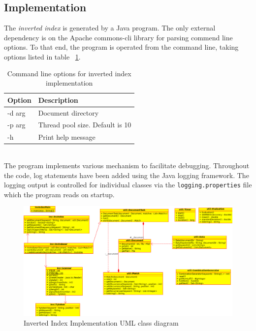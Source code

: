 \documentclass[10pt]{report}
\begin{document}
\subsection*{Implementation}
The \textit{inverted index} is generated by a Java
program. The only external dependency is on the Apache commons-cli
library for parsing commend line options. To that end, the program is
operated from the command line, taking options listed in table
~\ref{tab:invcommandline}.  
\\
\begin{table}[h]
  \centering
  \begin{tabular}{ |l|p{10cm}|} 
    \hline
    Option & Description \\ \hline
    -d \<arg\>  &  Document directory \\ \hline
    -p \<arg\>  &  Thread pool size. Default is 10 \\ \hline
    -h          &  Print help message \\ \hline
  \end{tabular}
  \caption{Command line options for inverted index implementation}
  \label{tab:invcommandline}
\end{table}
\\

The program implements various mechanism to facilitate
debugging. Throughout the code, log statements have been added using
the Java logging framework. The logging output is controlled for
individual classes via the \texttt{logging.properties} file which the
program reads on startup.

\begin{figure}
  \begin{center}
	\includegraphics[angle=90,width=!,height=0.90\textheight]{invuml}
  \end{center}
  \caption{Inverted Index Implementation UML class diagram}
  \label{fig:invuml}
\end{figure} 
\end{document}
